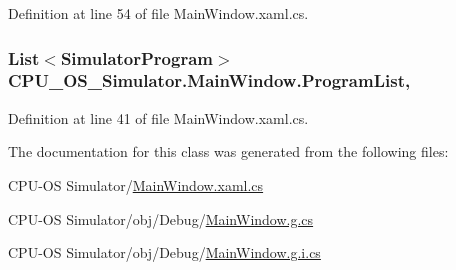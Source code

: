 Definition at line 54 of file Main\+Window.\+xaml.\+cs.

\hypertarget{class_c_p_u___o_s___simulator_1_1_main_window_a632c91cdd16a7498bbb8dfb3e5df252c}{}
\subsubsection[{Program\+List}]{\setlength{\rightskip}{0pt plus 5cm}List$<${\bf Simulator\+Program}$>$ C\+P\+U\+\_\+\+O\+S\+\_\+\+Simulator.\+Main\+Window.\+Program\+List\hspace{0.3cm}{\ttfamily [get]}, {\ttfamily [set]}}\label{class_c_p_u___o_s___simulator_1_1_main_window_a632c91cdd16a7498bbb8dfb3e5df252c}


Definition at line 41 of file Main\+Window.\+xaml.\+cs.



The documentation for this class was generated from the following files\+:\begin{DoxyCompactItemize}
\item 
C\+P\+U-\/\+O\+S Simulator/\hyperlink{_main_window_8xaml_8cs}{Main\+Window.\+xaml.\+cs}\item 
C\+P\+U-\/\+O\+S Simulator/obj/\+Debug/\hyperlink{_main_window_8g_8cs}{Main\+Window.\+g.\+cs}\item 
C\+P\+U-\/\+O\+S Simulator/obj/\+Debug/\hyperlink{_main_window_8g_8i_8cs}{Main\+Window.\+g.\+i.\+cs}\end{DoxyCompactItemize}
